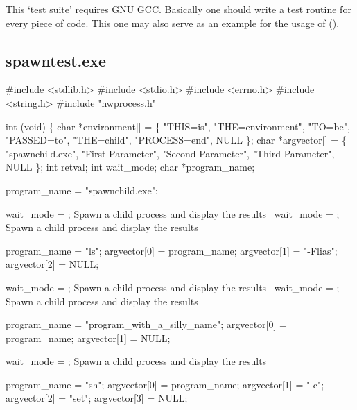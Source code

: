 \documentclass[11pt,a4paper]{article}%
\begin{document}
This `test suite' requires GNU GCC. Basically one should write
a test routine for every piece of code. This one may also serve as 
an example for the usage of {\Tt{}()}.

\subsection {{\Tt{}spawntest.exe}}
\nwenddocs{}\endmoddef\nwstartdeflinemarkup\nwenddeflinemarkup
#include <stdlib.h> 
#include <stdio.h> 
#include <errno.h>
#include <string.h>
#include "nwprocess.h"

int 
 (void)
\{
  char *environment[] = \{
    "THIS=is",
    "THE=environment",
    "TO=be",
    "PASSED=to",
    "THE=child",
    "PROCESS=end",
    NULL
  \};
  char *argvector[] = \{
    "spawnchild.exe",
    "First Parameter",
    "Second Parameter",
    "Third Parameter",
    NULL
  \};
  int retval;
  int wait_mode;
  char *program_name;
  
  program_name = "spawnchild.exe";

  wait_mode = ;
  \LA{}Spawn a child process and display the results~{\nwtagstyle{}}\RA{}
  wait_mode = ;
  \LA{}Spawn a child process and display the results~{\nwtagstyle{}}\RA{} 

  program_name = "ls";
  argvector[0] = program_name;
  argvector[1] = "-Flias";
  argvector[2] = NULL;
  
  wait_mode = ;
  \LA{}Spawn a child process and display the results~{\nwtagstyle{}}\RA{}
  wait_mode = ;
  \LA{}Spawn a child process and display the results~{\nwtagstyle{}}\RA{} 

  program_name = "program_with_a_silly_name";
  argvector[0] = program_name;
  argvector[1] = NULL;
  
  wait_mode = ;
  \LA{}Spawn a child process and display the results~{\nwtagstyle{}}\RA{} 
  
  program_name = "sh";
    argvector[0] = program_name;
    argvector[1] = "-c";
    argvector[2] = "set";
    argvector[3] = NULL;
\end{document}
